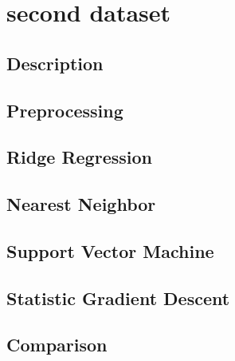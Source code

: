 \section{second dataset}
\subsection{Description}
\subsection{Preprocessing}
\subsection{Ridge Regression}
\subsection{Nearest Neighbor}
\subsection{Support Vector Machine}
\subsection{Statistic Gradient Descent}
\subsection{Comparison}
